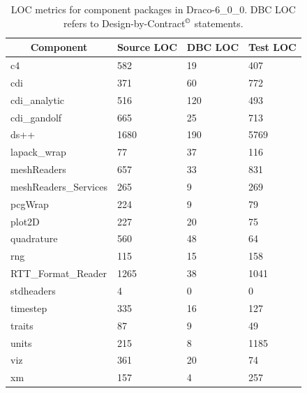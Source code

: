 \documentclass[note]{ResearchNote}
\newcommand{\draco}{Draco}
\newcommand{\dracor}{\draco-6\_0\_0}
\begin{document}
\begin{table}
  \caption{
    LOC metrics for component packages in \dracor.  DBC LOC refers to
    Design-by-Contract$^{\copyright}$ statements. 
  }
  \label{tab:loc}
  \begin{center}
    \begin{tabular}{llll}\hline\hline
      \multicolumn{1}{c}{Component} &
      \multicolumn{1}{c}{Source LOC} &
      \multicolumn{1}{c}{DBC LOC} &
      \multicolumn{1}{c}{Test LOC} \\\hline
      
      c4        &       582     &       19      &       407     \\
      cdi       &       371     &       60      &       772     \\
      cdi\_analytic      &       516     &       120     &       493     \\
      cdi\_gandolf       &       665     &       25      &       713     \\
      ds++      &       1680    &       190     &       5769    \\
      lapack\_wrap       &       77      &       37      &       116     \\
      meshReaders       &       657     &       33      &       831     \\
      meshReaders\_Services      &       265     &       9       & 269 \\
      pcgWrap   &       224     &       9       &       79      \\
      plot2D    &       227     &       20      &       75      \\
      quadrature        &       560     &       48      &       64      \\
      rng       &       115     &       15      &       158     \\
      RTT\_Format\_Reader &       1265    &       38      &       1041    \\
      stdheaders        &       4       &       0       &       0       \\
      timestep  &       335     &       16      &       127     \\
      traits    &       87      &       9       &       49      \\
      units     &       215     &       8       &       1185    \\
      viz       &       361     &       20      &       74      \\
      xm        &       157     &       4       &       257     \\
      \hline\hline
    \end{tabular}
  \end{center}
\end{table}
\end{document}
